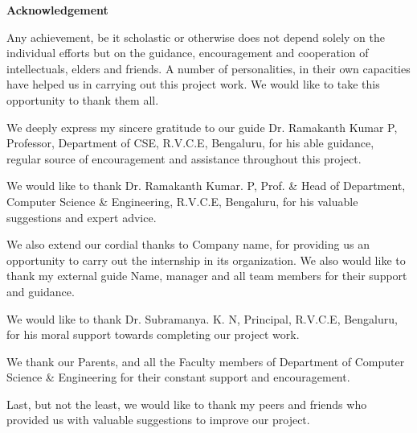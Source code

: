 \cleardoublepage




\begin{center}
	\huge\bfseries Acknowledgement
\end{center}

\bigskip

Any achievement, be it scholastic or otherwise does not depend solely on the individual efforts
but on the guidance, encouragement and cooperation of intellectuals, elders and friends.
A number of personalities, in their own capacities have helped us in carrying out this project work.
We would like to take this opportunity to thank them all. \bigskip

We deeply express my sincere gratitude to our guide Dr. Ramakanth Kumar P, Professor,
Department of CSE, R.V.C.E, Bengaluru, for his able guidance, regular source of encouragement and assistance
throughout this project. \bigskip

We would like to thank Dr. Ramakanth Kumar. P, Prof. \& Head of Department,
Computer Science \& Engineering, R.V.C.E, Bengaluru, for his valuable suggestions and expert advice.\bigskip

We also extend our cordial thanks to Company name, for providing us an opportunity to carry out the internship in its organization. We also would like to thank my external guide Name, manager and all team members for their support and guidance.\bigskip

We would like to thank Dr. Subramanya. K. N, Principal, R.V.C.E, Bengaluru, for his moral support towards completing our project work.\bigskip

We thank our Parents, and all the Faculty members of Department of
Computer Science \& Engineering for their constant support and encouragement.\bigskip

Last, but not the least, we would like to thank my peers and friends who
provided us with valuable suggestions to improve our project.

\pagebreak

